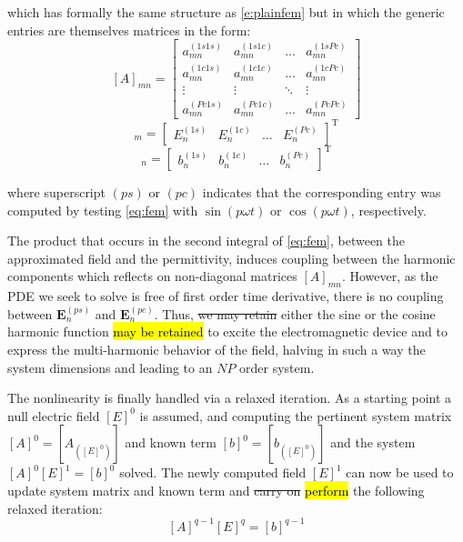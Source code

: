 \documentclass[journal]{IEEEtran}
\renewcommand{\vec}[1]{\mathbf{#1}}
\begin{document}
\noindent which has formally the same structure as \eqref{e:plainfem} but in
which the generic entries are themselves matrices in the form:
%
\begin{equation}\label{e:HBfemmn}
[A]_{mn}=
\begin{bmatrix}
a_{mn}^{(1s1s)} & a_{mn}^{(1s1c)} & \ldots &  a_{mn}^{(1sPc)} \\
a_{mn}^{(1c1s)} & a_{mn}^{(1c1c)} & \ldots &  a_{mn}^{(1cPc)} \\
\vdots & \vdots & \ddots & \vdots \\
a_{mn}^{(Pc1s)} & a_{mn}^{(Pc1c)} & \ldots &  a_{mn}^{(PcPc)}
\end{bmatrix}
\end{equation}
\begin{equation} 
[E]_m = 
\begin{bmatrix}
E_{n}^{(1s)} &
E_{n}^{(1c)} &
\ldots &
E_{n}^{(Pc)}
\end{bmatrix}^\text{T}
\end{equation}
\begin{equation} 
[b]_n = 
\begin{bmatrix}
b_{n}^{(1s)} &
b_{n}^{(1c)} &
\ldots &
b_{n}^{(Pc)}
\end{bmatrix}^\text{T}
\end{equation}

\noindent where superscript $(ps)$ or $(pc)$ indicates that the corresponding
entry was computed by testing \eqref{eq:fem} with $\sin(p \omega t)$ or
$\cos(p \omega t)$, respectively.

The product that occurs in the second integral of \eqref{eq:fem}, between the
approximated field and the permittivity, induces coupling between the harmonic
components which reflects on non-diagonal matrices $[A]_{mn}$. However, as the
PDE we seek to solve is free of first order time derivative, there is no 
coupling between $\vec{E}_{n}^{(ps)}$ and $\vec{E}_{n}^{(pc)}$. Thus, \st{we may
retain} either the sine or the cosine harmonic function \hl{may be retained} to 
excite the electromagnetic device and to express the multi-harmonic behavior of the 
field, halving in such a way the system dimensions and leading to an $NP$ order
system.

The nonlinearity is finally handled via a
relaxed iteration. As a starting point a null electric field $[E]^0$ is assumed,
and computing the pertinent system matrix $[A]^0=[A_{([E]^0)}]$ and
known term $[b]^0=[b_{([E]^0)}]$ and the system $[A]^0 [E]^1 =
[b]^0$ solved. The newly computed field $[E]^1$ can now be used to update system
matrix and known term and \st{carry on} \hl{perform} the following relaxed iteration:
%
\begin{equation} \label{eq:lastLinearSystem}
[A]^{q-1} [E]^{q} = [b]^{q-1}
\end{equation}
\end{document}
